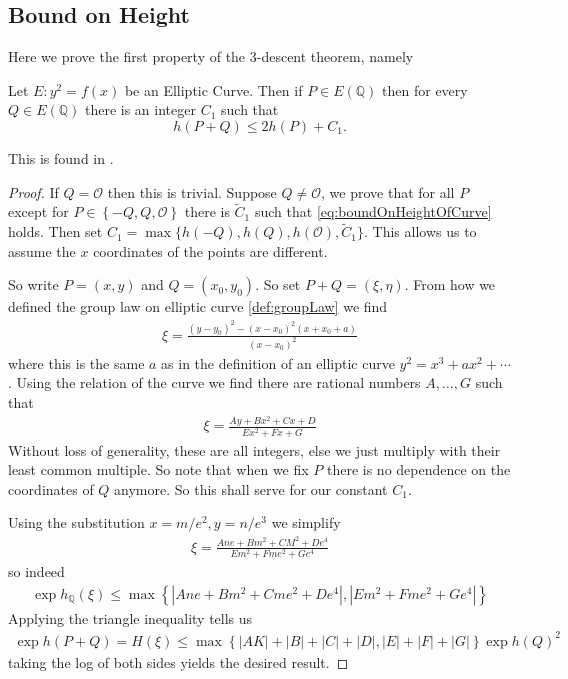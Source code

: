 \subsection{Bound on Height}%
\label{sub:bound_on_height}
Here we prove the first property of the 3-descent theorem, namely
\begin{lemma} \label{lem:boundHeight}
  Let $E: y^2 = f(x)$ be an Elliptic Curve.
  Then if $P \in E(\mathbb{Q})$ then for
  every $Q \in E(\mathbb{Q})$ there
  is an integer $C_1$ such that
  \begin{equation} \label{eq:boundOnHeightOfCurve}
    h(P + Q) \leq 2 h(P) + C_1.
  \end{equation}
\end{lemma}
This is found in \cite[section 3.2]{silvermanRationalPoints}.
\begin{proof}
  If $Q = \mathcal{O}$ then this
  is trivial.
  Suppose $Q \neq \mathcal{O}$,
  we prove that for all $P$ except
  for $ P \in \left\{ -Q, Q, \mathcal{O} \right\}$ there is
  $\tilde{C}_1$ such that \ref{eq:boundOnHeightOfCurve} holds.
  Then set $C_1 = \max\{h(-Q), h(Q), h(\mathcal{O}), \tilde{C}_1\}$.
  This allows us to assume the $x$ coordinates of the points
  are different.

  So write $P = (x,y)$ and $Q = (x_0, y_0)$.
  So set $P + Q = (\xi, \eta)$.
  From how we defined the group law
  on elliptic curve \ref{def:groupLaw} we find
  \begin{align*}
    \xi = \frac{(y - y_0)^2 - (x - x_0)^2(x + x_0 + a)}{(x - x_0)^2}
  \end{align*}
  where this is the same $a$ as in the definition of an elliptic curve $y^2 = x^3 + ax^2 + \cdots$.
  Using the relation of the curve we find
  there are rational numbers $A, \dots, G$ such that
  \begin{align*}
    \xi = \frac{Ay + Bx^2 + Cx + D}{Ex^2 + Fx + G}
  \end{align*}
  Without loss of generality, these are all integers, else
  we just multiply with their least common multiple.
  So note that when we fix $P$ there is no dependence on the
  coordinates of $Q$ anymore. So this shall serve for
  our constant $C_1$.

  Using the substitution $x = m/e^2, y = n/e^3$
  we simplify
  \begin{align*}
    \xi = \frac{Ane + Bm^2 + CM^2 + De^4}{Em^2 + Fme^2 + Ge^4}
  \end{align*}
  so indeed
  \begin{align*}
    \exp h_{\mathbb{Q}}(\xi) \leq \max \left\{ |Ane + Bm^2 + Cme^2 + De^4|, |Em^2 + Fme^2 + Ge^4| \right\}
  \end{align*}
  Applying the triangle inequality tells us
  \begin{align*}
    \exp h(P + Q) = H(\xi) \leq \max \left\{ |AK| + |B| + |C| + |D|, |E| + |F| + |G| \right\} \exp h(Q)^2
  \end{align*}
  taking the log of both sides yields the desired result.
\end{proof}

